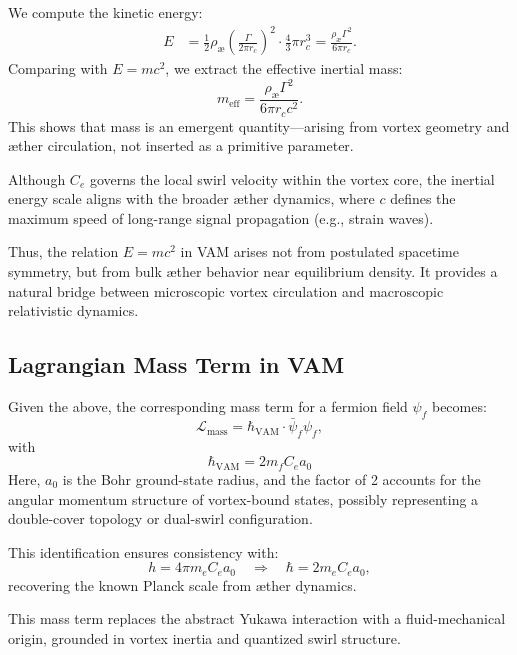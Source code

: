 We compute the kinetic energy:
\begin{align}
    E &= \frac{1}{2} \rho_\text{\ae} \left( \frac{\Gamma}{2\pi r_c} \right)^2 \cdot \frac{4}{3} \pi r_c^3
    = \frac{\rho_\text{\ae} \Gamma^2}{6\pi r_c}.
\end{align}
Comparing with \( E = m c^2 \), we extract the effective inertial mass:
\begin{equation}
    m_\text{eff} = \frac{\rho_\text{\ae} \Gamma^2}{6\pi r_c c^2}.
\end{equation}
This shows that mass is an emergent quantity—arising from vortex geometry and æther circulation, not inserted as a primitive parameter.

Although \( C_e \) governs the local swirl velocity within the vortex core, the inertial energy scale aligns with the broader æther dynamics, where \( c \) defines the maximum speed of long-range signal propagation (e.g., strain waves).

Thus, the relation \( E = m c^2 \) in VAM arises not from postulated spacetime symmetry, but from bulk æther behavior near equilibrium density. It provides a natural bridge between microscopic vortex circulation and macroscopic relativistic dynamics.


\subsection{Lagrangian Mass Term in VAM}

Given the above, the corresponding mass term for a fermion field $\psi_f$ becomes:
\begin{equation}
    \mathcal{L}_\text{mass} = \hbar_{\text{VAM}} \cdot \bar{\psi}_f \psi_f,
\end{equation}
with
\begin{equation}
    \boxed{
        \hbar_{\text{VAM}} = 2 m_f C_e a_0
    }
\end{equation}
Here, \( a_0 \) is the Bohr ground-state radius, and the factor of 2 accounts for the angular momentum structure of vortex-bound states, possibly representing a double-cover topology or dual-swirl configuration.

This identification ensures consistency with:
\[
    h = 4\pi m_e C_e a_0 \quad \Rightarrow \quad \hbar = 2 m_e C_e a_0,
\]
recovering the known Planck scale from æther dynamics.

This mass term replaces the abstract Yukawa interaction with a fluid-mechanical origin, grounded in vortex inertia and quantized swirl structure.
